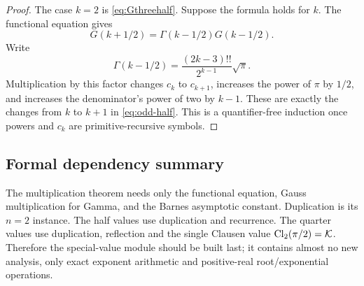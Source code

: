 \begin{proof}
The case \(k=2\) is \cref{eq:Gthreehalf}.  Suppose the formula holds for
\(k\).  The functional equation gives
\[
 G(k+1/2)=\Gamma(k-1/2)G(k-1/2).
\]
Write
\[
 \Gamma(k-1/2)=\frac{(2k-3)!!}{2^{k-1}}\sqrt\pi.
\]
Multiplication by this factor changes \(c_k\) to \(c_{k+1}\), increases the
power of \(\pi\) by \(1/2\), and increases the denominator's power of two by
\(k-1\).  These are exactly the changes from \(k\) to \(k+1\) in
\cref{eq:odd-half}.  This is a quantifier-free induction once powers and
\(c_k\) are primitive-recursive symbols.
\end{proof}

\subsection{Formal dependency summary}

The multiplication theorem needs only the functional equation, Gauss
multiplication for Gamma, and the Barnes asymptotic constant.  Duplication is
its \(n=2\) instance.  The half values use duplication and recurrence.  The
quarter values use duplication, reflection and the single Clausen value
\(\operatorname{Cl}_2(\pi/2)=\mathcal K\).  Therefore the special-value module should be built
last; it contains almost no new analysis, only exact exponent arithmetic and
positive-real root/exponential operations.
